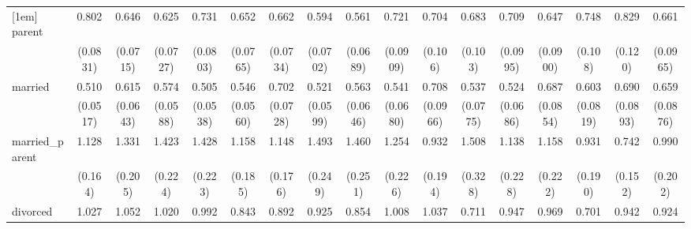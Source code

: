 {\begin{tabular}{l*{16}{c}}
[1em]
parent              &       0.802\sym{*}  &       0.646\sym{***}&       0.625\sym{***}&       0.731\sym{**} &       0.652\sym{***}&       0.662\sym{***}&       0.594\sym{***}&       0.561\sym{***}&       0.721\sym{**} &       0.704\sym{*}  &       0.683\sym{*}  &       0.709\sym{*}  &       0.647\sym{**} &       0.748\sym{*}  &       0.829         &       0.661\sym{**} \\
                    &    (0.0831)         &    (0.0715)         &    (0.0727)         &    (0.0803)         &    (0.0765)         &    (0.0734)         &    (0.0702)         &    (0.0689)         &    (0.0909)         &     (0.106)         &     (0.103)         &    (0.0995)         &    (0.0900)         &     (0.108)         &     (0.120)         &    (0.0965)         \\
[1em]
married             &       0.510\sym{***}&       0.615\sym{***}&       0.574\sym{***}&       0.505\sym{***}&       0.546\sym{***}&       0.702\sym{***}&       0.521\sym{***}&       0.563\sym{***}&       0.541\sym{***}&       0.708\sym{*}  &       0.537\sym{***}&       0.524\sym{***}&       0.687\sym{**} &       0.603\sym{***}&       0.690\sym{**} &       0.659\sym{**} \\
                    &    (0.0517)         &    (0.0643)         &    (0.0588)         &    (0.0538)         &    (0.0560)         &    (0.0728)         &    (0.0599)         &    (0.0646)         &    (0.0680)         &    (0.0966)         &    (0.0775)         &    (0.0686)         &    (0.0854)         &    (0.0819)         &    (0.0893)         &    (0.0876)         \\
[1em]
married\_parent      &       1.128         &       1.331         &       1.423\sym{*}  &       1.428\sym{*}  &       1.158         &       1.148         &       1.493\sym{*}  &       1.460\sym{*}  &       1.254         &       0.932         &       1.508         &       1.138         &       1.158         &       0.931         &       0.742         &       0.990         \\
                    &     (0.164)         &     (0.205)         &     (0.224)         &     (0.223)         &     (0.185)         &     (0.176)         &     (0.249)         &     (0.251)         &     (0.226)         &     (0.194)         &     (0.328)         &     (0.228)         &     (0.222)         &     (0.190)         &     (0.152)         &     (0.202)         \\
[1em]
divorced            &       1.027         &       1.052         &       1.020         &       0.992         &       0.843         &       0.892         &       0.925         &       0.854         &       1.008         &       1.037         &       0.711         &       0.947         &       0.969         &       0.701\sym{*}  &       0.942         &       0.924         \\

\end{tabular}}

